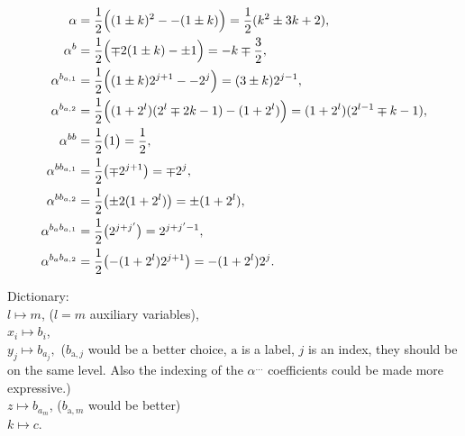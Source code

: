 \documentclass[a4paper,11pt]{article}
\begin{document}
\begin{subequations}
\label{eq:BCR34alpha}
\begin{align}
\alpha &=\frac12\Bigl((1\pm k)^2--(1\pm k) \Bigr)= \frac12(k^2\pm3k+2), \\
%
\alpha^{b} &= \frac12\Bigl(\mp 2(1\pm k)-\pm1\Bigr)= -k\mp\frac32, \\
\alpha^{b_{a,1}} &= \frac12\Bigl((1\pm k)2^{j+1}--2^j\Bigr)= (3\pm k)2^{j-1}, \\
\alpha^{b_{a,2}} &= \frac12\Bigl((1+2^l)(2^l\mp2k-1)-(1+2^l)\Bigr)= (1+2^l)(2^{l-1}\mp k-1), \\
%
\alpha^{bb} &= \frac12\bigl(1\bigr)= \frac12, \\
\alpha^{bb_{a,1}} &= \frac12\bigl(\mp2^{j+1}\bigr)= \mp2^j, \\
\alpha^{bb_{a,2}} &= \frac12\bigl(\pm2(1+2^l)\bigr)= \pm(1+2^l), \\
\alpha^{b_ab_{a,1}} &= \frac12\bigl(2^{j+j'}\bigr)= 2^{j+j'-1}, \\
\alpha^{b_ab_{a,2}} &= \frac12\bigl(-(1+2^l)2^{j+1}\bigr)= -(1+2^l)2^{j}.
\end{align}
\end{subequations}

Dictionary: \\
$l\mapsto m$, ($l=m$ auxiliary variables),\\
$x_i\mapsto b_i$, \\
$y_j\mapsto b_{a_j},$ 
($b_{\text{a},j}$ would be a better choice, $\text{a}$ is a label, $j$ is an index, they should be on the same level.
Also the indexing of the $\alpha^{\dots}$ coefficients could be made more expressive.)\\
$z\mapsto b_{a_m}$, ($b_{\text{a},m}$ would be better)\\
$k\mapsto c$.
\end{document}
